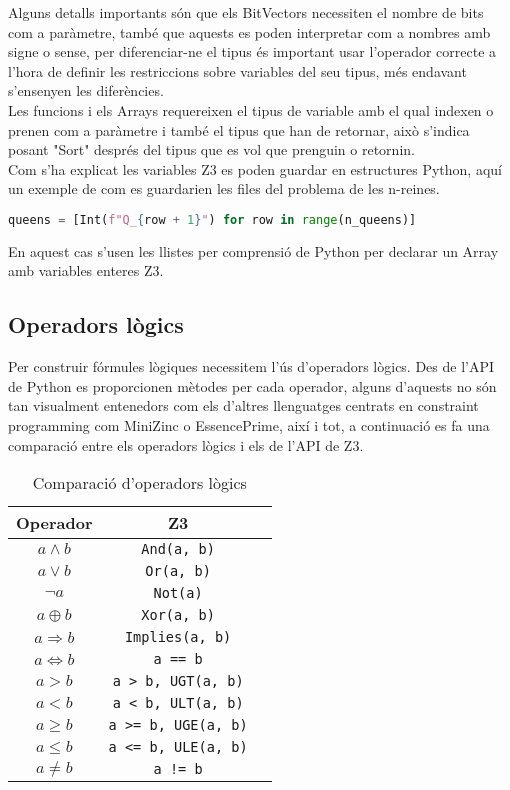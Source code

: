Alguns detalls importants són que els BitVectors necessiten el nombre de bits com a paràmetre, també que aquests es poden interpretar com a nombres amb signe o sense, per diferenciar-ne el tipus és important usar l'operador correcte a l'hora de definir les restriccions sobre variables del seu tipus, més endavant s'ensenyen les diferències.\\
Les funcions i els Arrays requereixen el tipus de variable amb el qual indexen o prenen com a paràmetre i també el tipus que han de retornar, això s'indica posant "Sort" després del tipus que es vol que prenguin o retornin.\\

Com s'ha explicat les variables Z3 es poden guardar en estructures Python, aquí un exemple de com es guardarien les files del problema de les n-reines.
\begin{lstlisting}[language=Python, caption=Variables Z3 en arrays de Python]
queens = [Int(f"Q_{row + 1}") for row in range(n_queens)]
\end{lstlisting}
En aquest cas s'usen les llistes per comprensió de Python per declarar un Array amb variables enteres Z3.

\subsection{Operadors lògics}
Per construir fórmules lògiques necessitem l'ús d'operadors lògics. Des de l'API de Python es proporcionen mètodes per cada operador, alguns d'aquests no són tan visualment entenedors com els d'altres llenguatges centrats en constraint programming com MiniZinc o EssencePrime, així i tot, a continuació es fa una comparació entre els operadors lògics i els de l'API de Z3.

\begin{table}[h]
\centering
\begin{tabular}{|c|c|c|}
\hline
\textbf{Operador} & \textbf{Z3} \\
\hline
$a \land b$ & \verb|And(a, b)|  \\
\hline
$a \lor b$ & \verb|Or(a, b)|  \\
\hline
$\lnot a$ & \verb|Not(a)|  \\
\hline
$a \oplus b$ & \verb|Xor(a, b)|  \\
\hline
$a \Rightarrow b$ & \verb|Implies(a, b)|  \\
\hline
$a \Leftrightarrow b$ & \verb|a == b|  \\
\hline
$a > b$ & \verb|a > b, UGT(a, b)|  \\
\hline
$a < b$ & \verb|a < b, ULT(a, b)|  \\
\hline
$a \geq b$ & \verb|a >= b, UGE(a, b)|  \\
\hline
$a \leq b$ & \verb|a <= b, ULE(a, b)|  \\
\hline
$a \neq b$ & \verb|a != b|  \\
\hline
\end{tabular}
\caption{Comparació d'operadors lògics}
\label{tab:logic_oprator_comparison}
\end{table}

